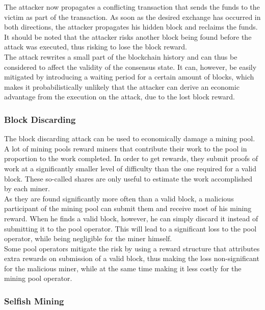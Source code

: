 \documentclass[12pt,a4paper]{article}
\begin{document}
The attacker now propagates a conflicting transaction that sends the funds to the victim as part of the transaction. As soon as the desired exchange has occurred in both directions, the attacker propagates his hidden block and reclaims the funds. It should be noted that the attacker risks another block being found before the attack was executed, thus risking to lose the block reward.\\

The attack rewrites a small part of the blockchain history and can thus be considered to affect the validity of the consensus state. It can, however, be easily mitigated by introducing a waiting period for a certain amount of blocks, which makes it probabilistically unlikely that the attacker can derive an economic advantage from the execution on the attack, due to the lost block reward.\\

\subsubsection{Block Discarding}

The block discarding attack can be used to economically damage a mining pool. A lot of mining pools reward miners that contribute their work to the pool in proportion to the work completed. In order to get rewards, they submit proofs of work at a significantly smaller level of difficulty than the one required for a valid block. These so-called shares are only useful to estimate the work accomplished by each miner.\\

As they are found significantly more often than a valid block, a malicious participant of the mining pool can submit them and receive most of his mining reward. When he finds a valid block, however, he can simply discard it instead of submitting it to the pool operator. This will lead to a significant loss to the pool operator, while being negligible for the miner himself.\\

Some pool operators mitigate the risk by using a reward structure that attributes extra rewards on submission of a valid block, thus making the loss non-significant for the malicious miner, while at the same time making it less costly for the mining pool operator.\\

\subsubsection{Selfish Mining}
\end{document}
